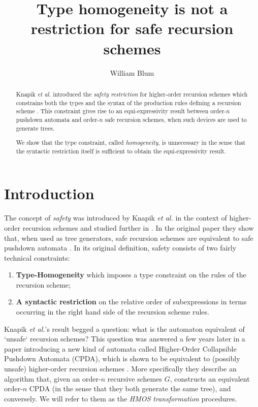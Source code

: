 \documentclass[a4paper]{article}[12pt]
\author{William Blum}
\title{Type homogeneity is not a restriction for safe recursion schemes}
\theoremstyle{remark}
\theoremstyle{definition}
\begin{document}
\maketitle
\begin{abstract}
Knapik \emph{et al.} introduced the \emph{safety restriction} for higher-order recursion schemes which constrains both the types and the syntax of the production rules defining a recursion scheme \cite{KNU02}. This constraint gives rise to an equi-expressivity result between
order-$n$ pushdown automata and order-$n$ safe recursion schemes, when such devices are used to generate trees.

We show that the type constraint, called \emph{homogeneity}, is unnecessary in the sense that the syntactic restriction itself is sufficient to obtain the
equi-expressivity result.
\end{abstract}

\section{Introduction}
The concept of \emph{safety} was introduced by Knapik \emph{et al.} in the
context of higher-order recursion schemes and studied further in \cite{KNU02,
demirandathesis}. In the original paper they show that, when used as tree
generators, safe recursion schemes are equivalent to safe pushdown automata
\cite{KNU02}.
In its original definition, safety consists of two fairly technical constraints:
\begin{enumerate}
\item \textbf{Type-Homogeneity} which imposes a type constraint on the rules of
the recursion scheme;
\item \textbf{A syntactic restriction} on the relative order of subexpressions
in terms occurring in the right hand side of the recursion scheme rules.
\end{enumerate}

Knapik \emph{et al.}'s result begged a question: what is the automaton
equivalent of `unsafe` recursion schemes?
This question was answered a few years later in a paper introducing a new kind
of automata called Higher-Order Collapsible Pushdown Automata (CPDA), which is
shown to be equivalent to (possibly unsafe) higher-order recursion schemes
\cite{hmos-lics08}. More specifically they describe an algorithm that, given an
order-$n$ recursive schemes $G$, constructs an equivalent order-$n$ CPDA (in the
sense that they both generate the same tree), and conversely. We will refer to
them as the \emph{HMOS transformation} procedures.
\end{document}
